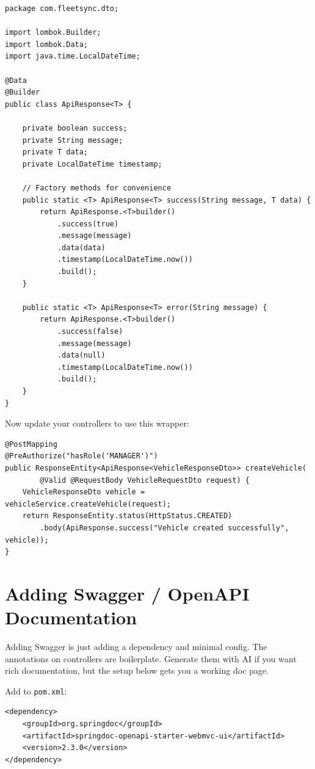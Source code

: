 \documentclass[12pt,a4paper]{report}
\newcommand{\file}[1]{\texttt{\textcolor{successgreen}{#1}}}
\begin{document}
\begin{lstlisting}[caption=ApiResponse.java -- Standard Response Wrapper]
package com.fleetsync.dto;

import lombok.Builder;
import lombok.Data;
import java.time.LocalDateTime;

@Data
@Builder
public class ApiResponse<T> {

    private boolean success;
    private String message;
    private T data;
    private LocalDateTime timestamp;

    // Factory methods for convenience
    public static <T> ApiResponse<T> success(String message, T data) {
        return ApiResponse.<T>builder()
            .success(true)
            .message(message)
            .data(data)
            .timestamp(LocalDateTime.now())
            .build();
    }

    public static <T> ApiResponse<T> error(String message) {
        return ApiResponse.<T>builder()
            .success(false)
            .message(message)
            .data(null)
            .timestamp(LocalDateTime.now())
            .build();
    }
}
\end{lstlisting}

Now update your controllers to use this wrapper:
\begin{lstlisting}[caption=Updated Controller with ApiResponse wrapper]
@PostMapping
@PreAuthorize("hasRole('MANAGER')")
public ResponseEntity<ApiResponse<VehicleResponseDto>> createVehicle(
        @Valid @RequestBody VehicleRequestDto request) {
    VehicleResponseDto vehicle = vehicleService.createVehicle(request);
    return ResponseEntity.status(HttpStatus.CREATED)
        .body(ApiResponse.success("Vehicle created successfully", vehicle));
}
\end{lstlisting}

\section{Adding Swagger / OpenAPI Documentation}

\begin{tcolorbox}[aibox]
Adding Swagger is just adding a dependency and minimal config. The annotations on controllers are boilerplate. Generate them with AI if you want rich documentation, but the setup below gets you a working doc page.
\end{tcolorbox}

Add to \file{pom.xml}:
\begin{lstlisting}[style=xmlstyle,caption=Swagger OpenAPI Dependency]
<dependency>
    <groupId>org.springdoc</groupId>
    <artifactId>springdoc-openapi-starter-webmvc-ui</artifactId>
    <version>2.3.0</version>
</dependency>
\end{lstlisting}
\end{document}
